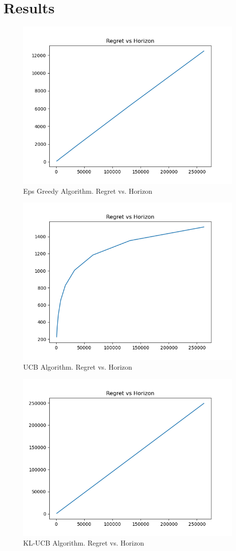 \documentclass{article}
\begin{document}
\section{Results}
\begin{figure}[hb]
    \centering
    \includegraphics[width=0.68\linewidth]{../imgs/task1-Eps_Greedy-20250218-154744.png}
    \caption{Eps Greedy Algorithm. Regret vs. Horizon}\label{fig:eps_greedy}
\end{figure}
\begin{figure}[hb]
    \centering
    \includegraphics[width=0.68\linewidth]{../imgs/task1-UCB-20250218-155212.png}
    \caption{UCB Algorithm. Regret vs. Horizon}\label{fig:ucb}
\end{figure}
\newpage
\begin{figure}[hb]
    \centering
    \includegraphics[width=0.68\linewidth]{../imgs/task1-KL_UCB-20250218-164050.png}
    \caption{KL-UCB Algorithm. Regret vs. Horizon}\label{fig:kl_ucb}
\end{figure}
\end{document}

